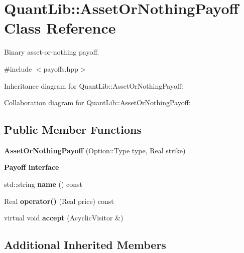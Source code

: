 \section{Quant\+Lib\+:\+:Asset\+Or\+Nothing\+Payoff Class Reference}
\label{class_quant_lib_1_1_asset_or_nothing_payoff}


Binary asset-\/or-\/nothing payoff.  




{\ttfamily \#include $<$payoffs.\+hpp$>$}



Inheritance diagram for Quant\+Lib\+:\+:Asset\+Or\+Nothing\+Payoff\+:


Collaboration diagram for Quant\+Lib\+:\+:Asset\+Or\+Nothing\+Payoff\+:
\subsection*{Public Member Functions}
\begin{DoxyCompactItemize}
\item 
{\bfseries Asset\+Or\+Nothing\+Payoff} (Option\+::\+Type type, Real strike)\label{class_quant_lib_1_1_asset_or_nothing_payoff_a0d098f2b552c98dc4c5192d2116848d6}

\end{DoxyCompactItemize}
\begin{Indent}{\bf Payoff interface}\par
\begin{DoxyCompactItemize}
\item 
std\+::string {\bfseries name} () const \label{class_quant_lib_1_1_asset_or_nothing_payoff_ad6055754c2e67d9678c52f48ce5d63c5}

\item 
Real {\bfseries operator()} (Real price) const \label{class_quant_lib_1_1_asset_or_nothing_payoff_a7ca0469f19ebf0cacd0c8899ffc8a44b}

\item 
virtual void {\bfseries accept} (Acyclic\+Visitor \&)\label{class_quant_lib_1_1_asset_or_nothing_payoff_aa6cdf3739487ebdb63cf5a6e50630325}

\end{DoxyCompactItemize}
\end{Indent}
\subsection*{Additional Inherited Members}


